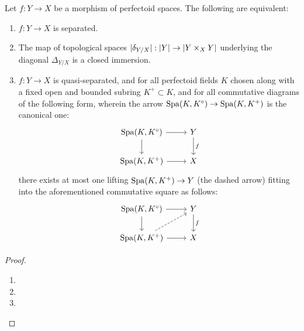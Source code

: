             \begin{theorem} \label{theorem: valuative_criterion_for_separatedness_for_morphisms_of_perfectoid_spaces}
                Let $f: Y \to X$ be a morphism of perfectoid spaces. The following are equivalent:
                    \begin{enumerate}
                        \item $f: Y \to X$ is separated.
                        \item The map of topological spaces $|\delta_{Y/X}|: |Y| \to |Y \x_X Y|$ underlying the diagonal $\Delta_{Y/X}$ is a closed immersion.
                        \item $f: Y \to X$ is quasi-separated, and for all perfectoid fields $K$ chosen along with a fixed open and bounded subring $K^+ \subset K$, and for all commutative diagrams of the following form, wherein the arrow $\mathrm{Spa}(K, K^{\circ}) \to \mathrm{Spa}(K, K^+)$ is the canonical one:
                            $$
                                \begin{tikzcd}
                                	{\Spa(K, K^{\circ})} & Y \\
                                	{\Spa(K, K^+)} & X
                                	\arrow["f", from=1-2, to=2-2]
                                	\arrow[from=1-1, to=2-1]
                                	\arrow[from=2-1, to=2-2]
                                	\arrow[from=1-1, to=1-2]
                                \end{tikzcd}
                            $$
                        there exists at most one lifting $\mathrm{Spa}(K, K^+) \to Y$ (the dashed arrow) fitting into the aforementioned commutative square as follows:
                            $$
                                \begin{tikzcd}
                                	{\Spa(K, K^{\circ})} & Y \\
                                	{\Spa(K, K^+)} & X
                                	\arrow["f", from=1-2, to=2-2]
                                	\arrow[from=1-1, to=2-1]
                                	\arrow[from=2-1, to=2-2]
                                	\arrow[from=1-1, to=1-2]
                                	\arrow[dashed, from=2-1, to=1-2]
                                \end{tikzcd}
                            $$
                    \end{enumerate}
            \end{theorem}
                \begin{proof}
                    \noindent
                    \begin{enumerate}
                        \item 
                        \item 
                        \item 
                    \end{enumerate}
                \end{proof}
        
